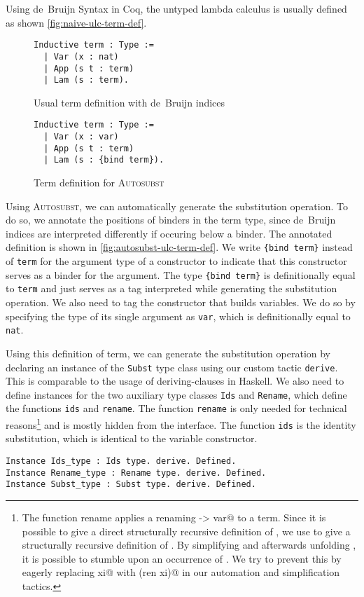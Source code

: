 \documentclass{scrartcl}
\newcommand{\Autosubst}{\textsc{Autosubst}\xspace}
\newcommand{\lst}{\lstinline}
\begin{document}
Using de~Bruijn Syntax in Coq, the untyped lambda calculus is usually defined as shown \autoref{fig:naive-ulc-term-def}.
\begin{figure}
\begin{minipage}{0.45\textwidth}
  \centering
\begin{lstlisting}
Inductive term : Type :=
  | Var (x : nat)
  | App (s t : term)
  | Lam (s : term).
\end{lstlisting}
  \caption{Usual term definition with de~Bruijn indices}
  \label{fig:naive-ulc-term-def}
\end{minipage}
\hfill
\begin{minipage}{0.45\textwidth} 
  \begin{lstlisting}
Inductive term : Type :=
  | Var (x : var)
  | App (s t : term)
  | Lam (s : {bind term}). 
\end{lstlisting}
\caption{Term definition for \Autosubst}
\label{fig:autosubst-ulc-term-def}
\end{minipage}
\end{figure}
Using \Autosubst, we can automatically generate the substitution operation.
To do so, we annotate the positions of binders in the term type, since de~Bruijn indices are interpreted differently if occuring below a binder. The annotated definition is shown in \autoref{fig:autosubst-ulc-term-def}.
We write \lst${bind term}$ instead of \lst$term$ for the argument type of a constructor to indicate that this constructor serves as a binder for the argument. 
The type \lst${bind term}$ is definitionally equal to \lst$term$ and just serves as a tag interpreted while generating the substitution operation.
We also need to tag the constructor that builds variables. We do so by specifying the type of its single argument as \lst$var$, which is definitionally equal to \lst$nat$.

Using this definition of term, we can generate the substitution operation \lst@subst@ by declaring an instance of the \lst$Subst$ type class using our custom tactic \lst$derive$. This is comparable to the usage of deriving-clauses in Haskell.
We also need to define instances for the two auxiliary type classes \lst$Ids$ and \lst$Rename$, which define the functions \lst$ids$ and \lst$rename$. 
The function \lst$rename$ is only needed for technical reasons\footnote{The function rename applies a renaming \lst@var -> var@ to a term. Since it is possible to give a direct structurally recursive definition of \lst@rename@, we use \lst@rename@ to give a structurally recursive definition of \lst@subst@. By simplifying \lst@subst@ and afterwards unfolding \lst@up@, it is possible to stumble upon an occurrence of \lst@rename@. We try to prevent this by eagerly replacing \lst@rename xi@ with \lst@subst (ren xi)@ in our automation and simplification tactics.} and is mostly hidden from the interface.
The function \lst$ids$ is the identity substitution, which is identical to the variable constructor.
\begin{lstlisting}
Instance Ids_type : Ids type. derive. Defined.
Instance Rename_type : Rename type. derive. Defined.
Instance Subst_type : Subst type. derive. Defined.
\end{lstlisting}
\end{document}
